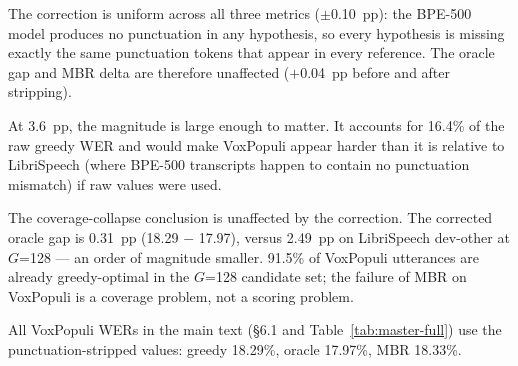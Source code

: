 The correction is uniform across all three metrics ($\pm$0.10~pp): the BPE-500 model produces no
punctuation in any hypothesis, so every hypothesis is missing exactly the same punctuation tokens
that appear in every reference. The oracle gap and MBR delta are therefore unaffected
($+$0.04~pp before and after stripping).

At 3.6~pp, the magnitude is large enough to matter. It accounts for 16.4\% of the raw greedy
WER and would make VoxPopuli appear harder than it is relative to LibriSpeech (where BPE-500
transcripts happen to contain no punctuation mismatch) if raw values were used.

The coverage-collapse conclusion is unaffected by the correction. The corrected oracle gap is
0.31~pp (18.29 $-$ 17.97), versus 2.49~pp on LibriSpeech dev-other at $G$=128 — an order of
magnitude smaller. 91.5\% of VoxPopuli utterances are already greedy-optimal in the $G$=128
candidate set; the failure of MBR on VoxPopuli is a coverage problem, not a scoring problem.

All VoxPopuli WERs in the main text (§6.1 and Table~\ref{tab:master-full}) use the
punctuation-stripped values: greedy 18.29\%, oracle 17.97\%, MBR 18.33\%.
